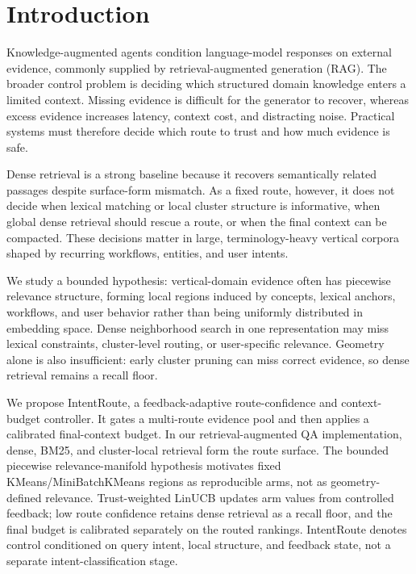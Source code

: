 
\section{Introduction}
\label{sec:02-introduction:introduction}

Knowledge-augmented agents condition language-model responses on external evidence, commonly supplied by retrieval-augmented generation (RAG). The broader control problem is deciding which structured domain knowledge enters a limited context. Missing evidence is difficult for the generator to recover, whereas excess evidence increases latency, context cost, and distracting noise. Practical systems must therefore decide which route to trust and how much evidence is safe.

Dense retrieval is a strong baseline because it recovers semantically related passages despite surface-form mismatch. As a fixed route, however, it does not decide when lexical matching or local cluster structure is informative, when global dense retrieval should rescue a route, or when the final context can be compacted. These decisions matter in large, terminology-heavy vertical corpora shaped by recurring workflows, entities, and user intents.

We study a bounded hypothesis: vertical-domain evidence often has piecewise relevance structure, forming local regions induced by concepts, lexical anchors, workflows, and user behavior rather than being uniformly distributed in embedding space. Dense neighborhood search in one representation may miss lexical constraints, cluster-level routing, or user-specific relevance. Geometry alone is also insufficient: early cluster pruning can miss correct evidence, so dense retrieval remains a recall floor.

We propose IntentRoute, a feedback-adaptive route-confidence and context-budget controller. It gates a multi-route evidence pool and then applies a calibrated final-context budget. In our retrieval-augmented QA implementation, dense, BM25, and cluster-local retrieval form the route surface. The bounded piecewise relevance-manifold hypothesis motivates fixed KMeans/MiniBatchKMeans regions as reproducible arms, not as geometry-defined relevance. Trust-weighted LinUCB updates arm values from controlled feedback; low route confidence retains dense retrieval as a recall floor, and the final budget is calibrated separately on the routed rankings. IntentRoute denotes control conditioned on query intent, local structure, and feedback state, not a separate intent-classification stage.

